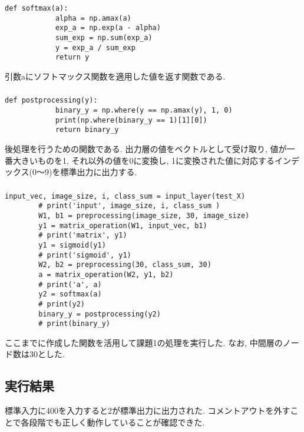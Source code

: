 \documentclass[a4j, titlepage]{jarticle}
\begin{document}
    \subsubsection*{}
        \begin{lstlisting}[caption=ソフトマックス関数,label=fuga]
        def softmax(a):
            alpha = np.amax(a)
            exp_a = np.exp(a - alpha)
            sum_exp = np.sum(exp_a)
            y = exp_a / sum_exp
            return y
        \end{lstlisting}
        引数aにソフトマックス関数を適用した値を返す関数である.

    \subsubsection*{}
        \begin{lstlisting}[caption=後処理,label=fuga]
        def postprocessing(y):
            binary_y = np.where(y == np.amax(y), 1, 0)
            print(np.where(binary_y == 1)[1][0])
            return binary_y
        \end{lstlisting}
        後処理を行うための関数である.
        出力層の値をベクトルとして受け取り, 値が一番大きいものを1, それ以外の値を0に変換し, 1に変換された値に対応するインデックス(0～9)を標準出力に出力する.

    \subsubsection*{}
        \begin{lstlisting}[caption=課題1の実行,label=fuga]
        input_vec, image_size, i, class_sum = input_layer(test_X)
        # print('input', image_size, i, class_sum )
        W1, b1 = preprocessing(image_size, 30, image_size)
        y1 = matrix_operation(W1, input_vec, b1)
        # print('matrix', y1)
        y1 = sigmoid(y1)
        # print('sigmoid', y1)
        W2, b2 = preprocessing(30, class_sum, 30)
        a = matrix_operation(W2, y1, b2)
        # print('a', a)
        y2 = softmax(a)
        # print(y2)
        binary_y = postprocessing(y2)
        # print(binary_y)
        \end{lstlisting}
        ここまでに作成した関数を活用して課題1の処理を実行した.
        なお, 中間層のノード数は30とした.

\subsection*{実行結果}
    標準入力に400を入力すると2が標準出力に出力された.
    コメントアウトを外すことで各段階でも正しく動作していることが確認できた.
\end{document}
